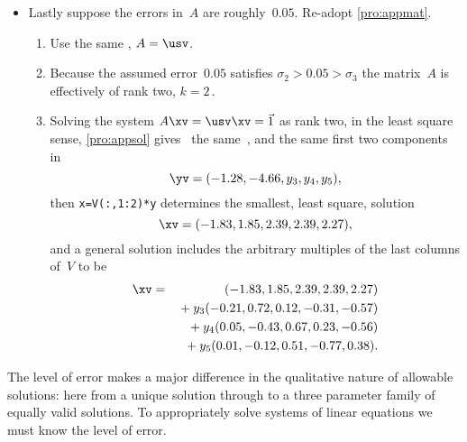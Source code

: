 \begin{example}
\begin{solution}
\begin{itemize}
\item Lastly suppose the errors in~\(A\) are roughly~\(0.05\).
Re-adopt \cref{pro:appmat}.
\begin{enumerate}
\item Use the same \svd, \(A=\usv\).
\item Because the assumed error~\(0.05\) satisfies \(\sigma_2>0.05>\sigma_3\) the matrix~\(A\) is effectively of rank two, \(k=2\)\,.
\item Solving the system \(A\xv=\usv\xv=\vec1\) as rank two, in the least square sense, \cref{pro:appsol} gives \twodp\ the same~\zv, and the same first two components in
\begin{equation*}
\yv=(-1.28,-4.66,y_3,y_4,y_5),
\end{equation*}
then \verb|x=V(:,1:2)*y| determines the smallest, least square, solution
\begin{equation*}
\xv=(-1.83,1.85,2.39,2.39,2.27),
\end{equation*}
and a general solution includes the arbitrary multiples of the last columns of~\(V\) to be
\begin{eqnarray*}
\xv&=&(-1.83,1.85,2.39,2.39,2.27)
\\&&{}+y_3(-0.21,0.72,0.12,-0.31,-0.57)
\\&&{}+y_4(0.05,-0.43,0.67,0.23,-0.56)
\\&&{}+y_5(0.01,-0.12,0.51,-0.77,0.38).
\end{eqnarray*}
\end{enumerate}
\end{itemize}
The level of error makes a major difference in the qualitative nature of allowable solutions: here from a unique solution through to a three parameter family of equally valid solutions.
To appropriately solve systems of linear equations we must know the level of error.
\end{solution}
\end{example}



